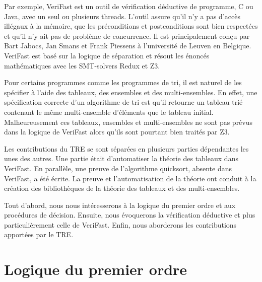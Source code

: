 \documentclass[11pt,openany]{article}
\newcommand{\verifast}{VeriFast}
\begin{document}
	Par exemple, \verifast{} est un outil de v\'erification d\'eductive de programme, C ou Java, avec un seul ou plusieurs threads. L'outil assure qu'il n'y a pas d'acc\`es ill\'egaux \`a la m\'emoire, que les pr\'econditions et postconditions sont bien respect\'ees et qu'il n'y ait pas de probl\`eme de concurrence. Il est principalement con\c{c}u par Bart Jabocs, Jan Smans et Frank Piessens \`a l'universit\'e de Leuven en Belgique. \verifast{} est bas\'e sur la logique de s\'eparation et r\'esout les \'enonc\'es math\'ematiques avec les SMT-solvers Redux et Z3.
	
	 Pour certains programmes comme les programmes de tri, il est naturel de les sp\'ecifier \`a l'aide des tableaux, des ensembles et des multi-ensembles. En effet, une sp\'ecification correcte d'un algorithme de tri est qu'il retourne un tableau tri\'e contenant le m\^eme multi-ensemble d'\'el\'ements que le tableau initial. Malheureusement ces tableaux, ensembles et multi-ensembles ne sont pas pr\'evus dans la logique de \verifast{} alors qu'ils sont pourtant bien trait\'es par Z3.
	 
	 Les contributions du TRE se sont s\'epar\'ees en plusieurs parties d\'ependantes les unes des autres. Une partie \'etait d'automatiser la th\'eorie des tableaux dans \verifast. En parall\`ele, une preuve de l'algorithme quicksort, absente dans \verifast, a \'et\'e \'ecrite. La preuve et l'automatisation de la th\'eorie ont conduit \`a la cr\'eation des biblioth\`eques de la th\'eorie des tableaux et des multi-ensembles.
	 
	Tout d'abord, nous nous int\'eresserons \`a la logique du premier ordre et aux proc\'edures de d\'ecision. Ensuite, nous \'evoquerons la v\'erification d\'eductive et plus particuli\`erement celle de \verifast. Enfin, nous aborderons les contributions apport\'ees par le TRE.

\section{Logique du premier ordre}
\end{document}
